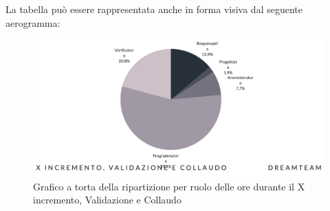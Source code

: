 La tabella può essere rappresentata anche in forma visiva dal seguente aerogramma:
\begin{figure}[H]
\centering
\includegraphics[scale=0.55]{Sezioni/SezioniPreventivo/grafici/Preventivo_torta_validazione_collaudo_X.png}
\caption{Grafico a torta della ripartizione per ruolo delle ore durante il X incremento, Validazione e Collaudo}
\end{figure}

\pagebreak

